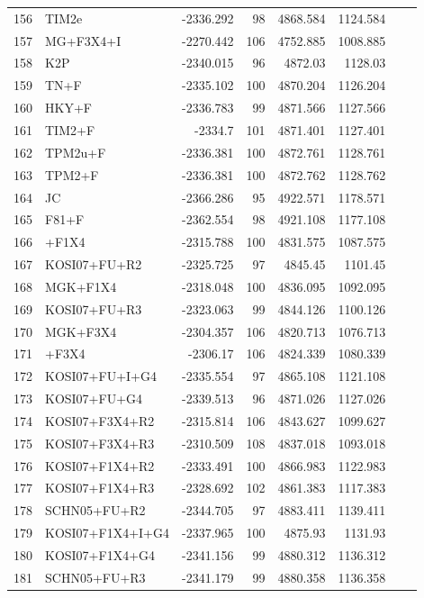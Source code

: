 \begin{longtable}{clrrrrrr}
	156 & TIM2e & -2336.292 & 98 & 4868.584 & 1124.584 \\ 
	157 & MG+F3X4+I & -2270.442 & 106 & 4752.885 & 1008.885 \\ 
	158 & K2P & -2340.015 & 96 & 4872.03 & 1128.03 \\ 
	159 & TN+F & -2335.102 & 100 & 4870.204 & 1126.204 \\ 
	160 & HKY+F & -2336.783 & 99 & 4871.566 & 1127.566 \\ 
	161 & TIM2+F & -2334.7 & 101 & 4871.401 & 1127.401 \\ 
	162 & TPM2u+F & -2336.381 & 100 & 4872.761 & 1128.761 \\ 
	163 & TPM2+F & -2336.381 & 100 & 4872.762 & 1128.762 \\ 
	164 & JC & -2366.286 & 95 & 4922.571 & 1178.571 \\ 
	165 & F81+F & -2362.554 & 98 & 4921.108 & 1177.108 \\ 
	166 & \gy+F1X4 & -2315.788 & 100 & 4831.575 & 1087.575 \\ 
	167 & KOSI07+FU+R2 & -2325.725 & 97 & 4845.45 & 1101.45 \\ 
	168 & MGK+F1X4 & -2318.048 & 100 & 4836.095 & 1092.095 \\ 
	169 & KOSI07+FU+R3 & -2323.063 & 99 & 4844.126 & 1100.126 \\ 
	170 & MGK+F3X4 & -2304.357 & 106 & 4820.713 & 1076.713 \\ 
	171 & \gy+F3X4 & -2306.17 & 106 & 4824.339 & 1080.339 \\ 
	172 & KOSI07+FU+I+G4 & -2335.554 & 97 & 4865.108 & 1121.108 \\ 
	173 & KOSI07+FU+G4 & -2339.513 & 96 & 4871.026 & 1127.026 \\ 
	174 & KOSI07+F3X4+R2 & -2315.814 & 106 & 4843.627 & 1099.627 \\ 
	175 & KOSI07+F3X4+R3 & -2310.509 & 108 & 4837.018 & 1093.018 \\ 
	176 & KOSI07+F1X4+R2 & -2333.491 & 100 & 4866.983 & 1122.983 \\ 
	177 & KOSI07+F1X4+R3 & -2328.692 & 102 & 4861.383 & 1117.383 \\ 
	178 & SCHN05+FU+R2 & -2344.705 & 97 & 4883.411 & 1139.411 \\ 
	179 & KOSI07+F1X4+I+G4 & -2337.965 & 100 & 4875.93 & 1131.93 \\ 
	180 & KOSI07+F1X4+G4 & -2341.156 & 99 & 4880.312 & 1136.312 \\ 
	181 & SCHN05+FU+R3 & -2341.179 & 99 & 4880.358 & 1136.358 \\ 

\end{longtable}
